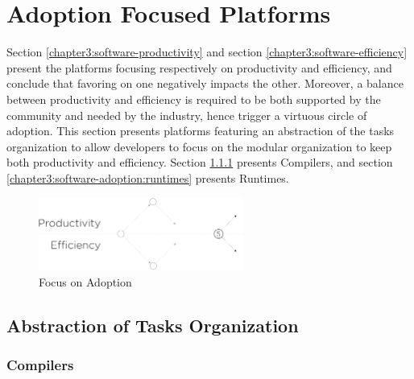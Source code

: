 \section{Adoption Focused Platforms} \label{chapter3:software-adoption}

Section \ref{chapter3:software-productivity} and section \ref{chapter3:software-efficiency} present the platforms focusing respectively on productivity and efficiency, and conclude that favoring on one negatively impacts the other.
Moreover, a balance between productivity and efficiency is required to be both supported by the community and needed by the industry, hence trigger a virtuous circle of adoption.
This section presents platforms featuring an abstraction of the tasks organization to allow developers to focus on the modular organization to keep both productivity and efficiency.
Section \ref{chapter3:software-adoption:compilers} presents Compilers, and section \ref{chapter3:software-adoption:runtimes} presents Runtimes.


\begin{figure}[!h]
\begin{center}
\includegraphics[width=0.6\textwidth]{../resources/state-of-the-art-5.pdf}
\end{center}
\caption{Focus on Adoption}
\label{fig:state-of-the-art-5}
\end{figure}

\subsection{Abstraction of Tasks Organization}

\subsubsection{Compilers} \label{chapter3:software-adoption:compilers}

